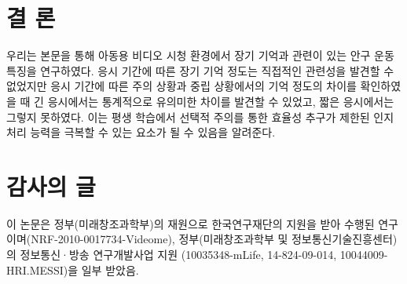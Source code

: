 \documentclass{kcc}
\begin{document}
\section{결 론}
우리는 본문을 통해 아동용 비디오 시청 환경에서 장기 기억과 관련이 있는 안구 운동 특징을 연구하였다. 응시 기간에 따른 장기 기억 정도는 직접적인 관련성을 발견할 수 없었지만 응시 기간에 따른 주의 상황과 중립 상황에서의 기억 정도의 차이를 확인하였을 때 긴 응시에서는 통계적으로 유의미한 차이를 발견할 수 있었고, 짧은 응시에서는 그렇지 못하였다. 이는 평생 학습에서 선택적 주의를 통한 효율성 추구가 제한된 인지 처리 능력을 극복할 수 있는 요소가 될 수 있음을 알려준다.


\section{감사의 글}
이 논문은 정부(미래창조과학부)의 재원으로 한국연구재단의 지원을 받아 수행된 연구이며(NRF-2010-0017734-Videome),
정부(미래창조과학부 및 정보통신기술진흥센터)의 정보통신·방송 연구개발사업 지원 (10035348-mLife, 14-824-09-014, 10044009-HRI.MESSI)을 일부 받았음.



\end{document}
